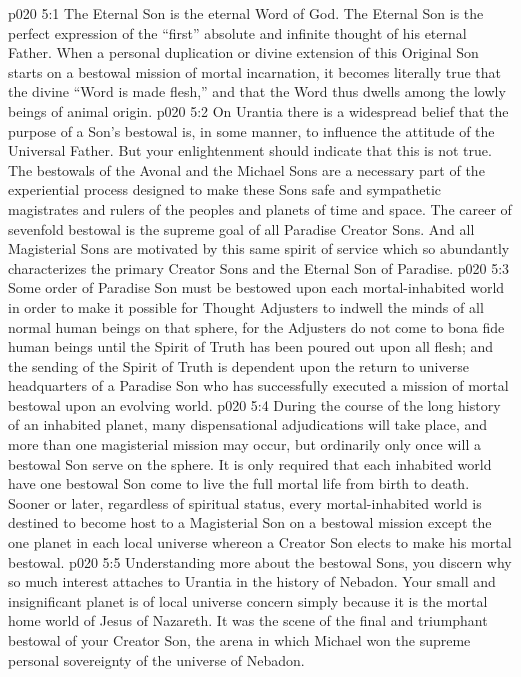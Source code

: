 \vs p020 5:1 The Eternal Son is the eternal Word of God. The Eternal Son is the perfect expression of the “first” absolute and infinite thought of his eternal Father. When a personal duplication or divine extension of this Original Son starts on a bestowal mission of mortal incarnation, it becomes literally true that the divine “Word is made flesh,” and that the Word thus dwells among the lowly beings of animal origin.
\vs p020 5:2 On Urantia there is a widespread belief that the purpose of a Son’s bestowal is, in some manner, to influence the attitude of the Universal Father. But your enlightenment should indicate that this is not true. The bestowals of the Avonal and the Michael Sons are a necessary part of the experiential process designed to make these Sons safe and sympathetic magistrates and rulers of the peoples and planets of time and space. The career of sevenfold bestowal is the supreme goal of all Paradise Creator Sons. And all Magisterial Sons are motivated by this same spirit of service which so abundantly characterizes the primary Creator Sons and the Eternal Son of Paradise.
\vs p020 5:3 Some order of Paradise Son must be bestowed upon each mortal\hyp{}inhabited world in order to make it possible for Thought Adjusters to indwell the minds of all normal human beings on that sphere, for the Adjusters do not come to  bona fide human beings until the Spirit of Truth has been poured out upon all flesh; and the sending of the Spirit of Truth is dependent upon the return to universe headquarters of a Paradise Son who has successfully executed a mission of mortal bestowal upon an evolving world.
\vs p020 5:4 During the course of the long history of an inhabited planet, many dispensational adjudications will take place, and more than one magisterial mission may occur, but ordinarily only once will a bestowal Son serve on the sphere. It is only required that each inhabited world have one bestowal Son come to live the full mortal life from birth to death. Sooner or later, regardless of spiritual status, every mortal\hyp{}inhabited world is destined to become host to a Magisterial Son on a bestowal mission except the one planet in each local universe whereon a Creator Son elects to make his mortal bestowal.
\vs p020 5:5 \pc Understanding more about the bestowal Sons, you discern why so much interest attaches to Urantia in the history of Nebadon. Your small and insignificant planet is of local universe concern simply because it is the mortal home world of Jesus of Nazareth. It was the scene of the final and triumphant bestowal of your Creator Son, the arena in which Michael won the supreme personal sovereignty of the universe of Nebadon.
